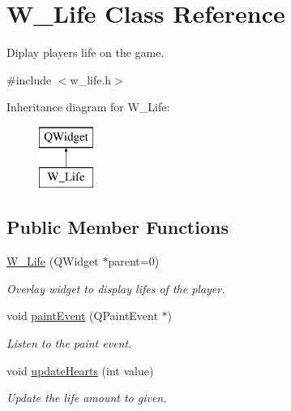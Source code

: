 \hypertarget{class_w___life}{}\section{W\+\_\+\+Life Class Reference}
\label{class_w___life}


Diplay player\textquotesingle{}s life on the game.  




{\ttfamily \#include $<$w\+\_\+life.\+h$>$}

Inheritance diagram for W\+\_\+\+Life\+:\begin{figure}[H]
\begin{center}
\leavevmode
\includegraphics[height=2.000000cm]{class_w___life}
\end{center}
\end{figure}
\subsection*{Public Member Functions}
\begin{DoxyCompactItemize}
\item 
\hyperlink{class_w___life_a25c76c113cc194318573f11ac513f391}{W\+\_\+\+Life} (Q\+Widget $\ast$parent=0)
\begin{DoxyCompactList}\small\item\em Overlay widget to display lifes of the player. \end{DoxyCompactList}\item 
\hypertarget{class_w___life_acfe041331828447c6667e3bad64fd357}{}void \hyperlink{class_w___life_acfe041331828447c6667e3bad64fd357}{paint\+Event} (Q\+Paint\+Event $\ast$)\label{class_w___life_acfe041331828447c6667e3bad64fd357}

\begin{DoxyCompactList}\small\item\em Listen to the paint event. \end{DoxyCompactList}\item 
void \hyperlink{class_w___life_aa07fc1f57cac5cd100fed66e4924b643}{update\+Hearts} (int value)
\begin{DoxyCompactList}\small\item\em Update the life amount to given. \end{DoxyCompactList}\end{DoxyCompactItemize}


